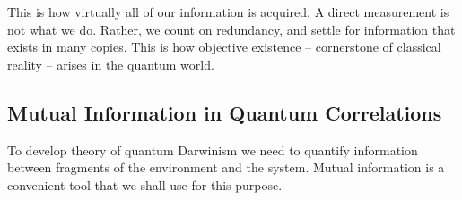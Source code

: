 \documentclass[aps,amsmath,amssymb,amsfonts,12pt]{revtex4-1}
\newcommand{\ket}[1]    {| #1 \rangle}
\newcommand{\cS}        {{\mathcal S}}
\newcommand{\+}         {\dagger}
\newcommand\hocom[1]{}%
\begin{document}
{{This is
how virtually all of our information is acquired. A direct measurement is not what we do. Rather, we
count on redundancy, and settle for information that exists in many copies. This is how objective existence -- cornerstone of classical reality -- arises in the quantum world. 



\hocom{ The existence of redundant copies of pointer states implies that observables which do not commute with
the pointer observable are inaccessible. The simplest model of quantum Darwinism that illustrates this
is a somewhat contrived arrangement of many ($N$) target qubits that constitute subsystems
of the environment interacting via a {\it controlled not} ({\tt c-not}) with a single control qubit $\cS$. As time goes on,
consecutive target qubits become imprinted with the state of the control $\cS$:
$$(a\ket 0+ b\ket 1)\otimes \ket {0_{\varepsilon_1}} \otimes \ket {0_{\varepsilon_2}}\dots \otimes \ket {0_{\varepsilon_N}} \Longrightarrow $$
$$
(a\ket 0\otimes \ket {0_{\varepsilon_1}} \otimes \ket {0_{\varepsilon_2}} + b\ket 1\otimes \ket {1_{\varepsilon_1}} \otimes \ket {1_{\varepsilon_2}})\dots \otimes \ket {0_{\varepsilon_N}} \Longrightarrow
$$
$$
a\ket 0\otimes \ket {0_{\varepsilon_1}} \otimes \dots \otimes \ket {0_{\varepsilon_N}} + b\ket 1\otimes \ket {1_{\varepsilon_1}} \dots \otimes \ket {1_{\varepsilon_N}} \ .  $$
This simple dynamics creates multiple records of the logical basis ``pointer'' states of the system in
the environment. The existence of the preferred pointer basis that is untouched by the interaction is
essential. As we have seen earlier, this is possible -- such quantum jumps emerge from the purely
quantum core postulates (o) - (iii).}

\subsection{Mutual Information in Quantum Correlations}

To develop theory of quantum Darwinism we need to quantify information between fragments of the environment and the system.
Mutual information is a convenient tool that we shall use for this purpose.

}}
\end{document}
